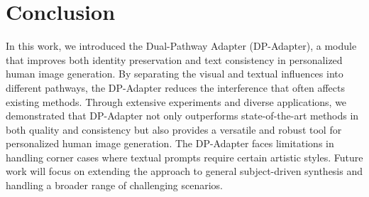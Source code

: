 
\section{Conclusion}
In this work, we introduced the Dual-Pathway Adapter (DP-Adapter), a module that improves both identity preservation and text consistency in personalized human image generation. By separating the visual and textual influences into different pathways, the DP-Adapter reduces the interference that often affects existing methods. Through extensive experiments and diverse applications, we demonstrated that DP-Adapter not only outperforms state-of-the-art methods in both quality and consistency but also provides a versatile and robust tool for personalized human image generation. The DP-Adapter faces limitations in handling corner cases where textual prompts require certain artistic styles. Future work will focus on extending the approach to general subject-driven synthesis and handling a broader range of challenging scenarios.